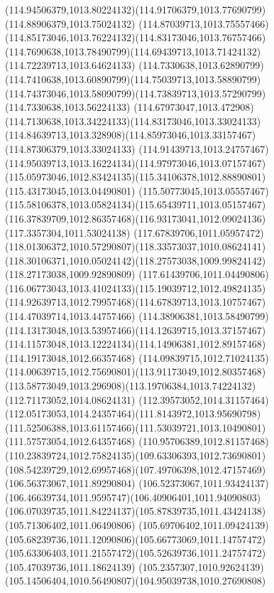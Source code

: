 {{  \curveto(114.94506379,1013.80224132)(114.91706379,1013.77690799)(114.88906379,1013.75024132)
  \curveto(114.87039713,1013.75557466)(114.85173046,1013.76224132)(114.83173046,1013.76757466)
  \curveto(114.7690638,1013.78490799)(114.69439713,1013.71424132)(114.72239713,1013.64624133)
  \curveto(114.7330638,1013.62890799)(114.7410638,1013.60890799)(114.75039713,1013.58890799)
  \curveto(114.74373046,1013.58090799)(114.73839713,1013.57290799)(114.7330638,1013.56224133)
  \curveto(114.67973047,1013.472908)(114.7130638,1013.34224133)(114.83173046,1013.33024133)
  \curveto(114.84639713,1013.328908)(114.85973046,1013.33157467)(114.87306379,1013.33024133)
  \curveto(114.91439713,1013.24757467)(114.95039713,1013.16224134)(114.97973046,1013.07157467)
  \curveto(115.05973046,1012.83424135)(115.34106378,1012.88890801)(115.43173045,1013.04490801)
  \curveto(115.50773045,1013.05557467)(115.58106378,1013.05824134)(115.65439711,1013.05157467)
  \curveto(116.37839709,1012.86357468)(116.93173041,1012.09024136)(117.3357304,1011.53024138)
  \curveto(117.67839706,1011.05957472)(118.01306372,1010.57290807)(118.33573037,1010.08624141)
  \curveto(118.30106371,1010.05024142)(118.27573038,1009.99824142)(118.27173038,1009.92890809)
  \curveto(117.61439706,1011.04490806)(116.06773043,1013.41024133)(115.19039712,1012.49824135)
  \curveto(114.92639713,1012.79957468)(114.67839713,1013.10757467)(114.47039714,1013.44757466)
  \curveto(114.38906381,1013.58490799)(114.13173048,1013.53957466)(114.12639715,1013.37157467)
  \curveto(114.11573048,1013.12224134)(114.14906381,1012.89157468)(114.19173048,1012.66357468)
  \curveto(114.09839715,1012.71024135)(114.00639715,1012.75690801)(113.91173049,1012.80357468)
  \curveto(113.58773049,1013.296908)(113.19706384,1013.74224132)(112.71173052,1014.08624131)
  \curveto(112.39573052,1014.31157464)(112.05173053,1014.24357464)(111.8143972,1013.95690798)
  \curveto(111.52506388,1013.61157466)(111.53039721,1013.10490801)(111.57573054,1012.64357468)
  \curveto(110.95706389,1012.81157468)(110.23839724,1012.75824135)(109.63306393,1012.73690801)
  \curveto(108.54239729,1012.69957468)(107.49706398,1012.47157469)(106.56373067,1011.89290804)
  \curveto(106.52373067,1011.93424137)(106.46639734,1011.9595747)(106.40906401,1011.94090803)
  \curveto(106.07039735,1011.84224137)(105.87839735,1011.43424138)(105.71306402,1011.06490806)
  \curveto(105.69706402,1011.09424139)(105.68239736,1011.12090806)(105.66773069,1011.14757472)
  \curveto(105.63306403,1011.21557472)(105.52639736,1011.24757472)(105.47039736,1011.18624139)
  \curveto(105.2357307,1010.92624139)(105.14506404,1010.56490807)(104.95039738,1010.27690808)
}}
